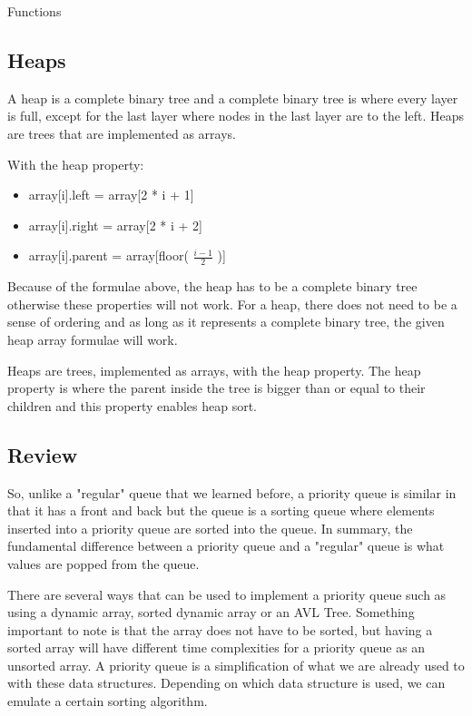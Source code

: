 \documentclass[11pt,a4paper,english]{report}
\begin{document}
\begin{bbox}{Functions}{



}\end{bbox}

\subsection{Heaps}

A heap is a complete binary tree and a complete binary tree is where every layer is full, except for the last layer where nodes in the last layer are to the left. Heaps are trees that are implemented as arrays.

\bigskip \noindent 
With the heap property:
\begin{itemize}
  \item array[i].left = array[2 * i + 1]
  \item array[i].right = array[2 * i + 2]
  \item array[i].parent = array[floor( $\frac{i - 1}{2}$ )]
\end{itemize}

\noindent Because of the formulae above, the heap has to be a complete binary tree otherwise these properties will not work. For a heap, there does not need to be a sense of ordering and as long as it represents a complete binary tree, the given heap array formulae will work.

\bigskip 
\noindent 
Heaps are trees, implemented as arrays, with the heap property. The heap property is where the parent inside the tree is bigger than or equal to their children and this property enables heap sort.


\subsection{Review}

So, unlike a "regular" queue that we learned before, a priority queue is similar in that it has a front and back but the queue is a sorting queue where elements inserted into a priority queue are sorted into the queue. In summary, the fundamental difference between a priority queue and a "regular" queue is what values are popped from the queue. 

\bigskip \noindent
There are several ways that can be used to implement a priority queue such as using a dynamic array, sorted dynamic array or an AVL Tree. Something important to note is that the array does not have to be sorted, but having a sorted array will have different time complexities for a priority queue as an unsorted array. A priority queue is a simplification of what we are already used to with these data structures. Depending on which data structure is used, we can emulate a certain sorting algorithm.
\end{document}
